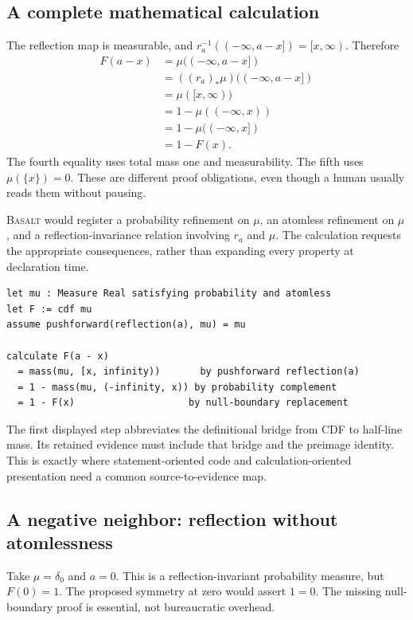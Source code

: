 \documentclass[11pt,a4paper]{article}
\newcommand{\Basalt}{\textsc{Basalt}}
\theoremstyle{plain}
\theoremstyle{definition}
\theoremstyle{remark}
\begin{document}
\subsection{A complete mathematical calculation}
The reflection map is measurable, and
$r_a^{-1}(({-}\infty,a-x])=[x,\infty)$. Therefore
\begin{align*}
 F(a-x)
 &=\mu(({-}\infty,a-x])\\
 &=((r_a)_*\mu)(({-}\infty,a-x])\\
 &=\mu([x,\infty))\\
 &=1-\mu(({-}\infty,x))\\
 &=1-\mu(({-}\infty,x])\\
 &=1-F(x).
\end{align*}
The fourth equality uses total mass one and measurability. The fifth uses
$\mu(\{x\})=0$. These are different proof obligations, even though a human
usually reads them without pausing.

\Basalt{} would register a probability refinement on $\mu$, an atomless
refinement on $\mu$, and a reflection-invariance relation involving $r_a$
and $\mu$. The calculation requests the appropriate consequences, rather
than expanding every property at declaration time.

\par\noindent\begin{minipage}{\linewidth}
\begin{lstlisting}
let mu : Measure Real satisfying probability and atomless
let F := cdf mu
assume pushforward(reflection(a), mu) = mu

calculate F(a - x)
  = mass(mu, [x, infinity))       by pushforward reflection(a)
  = 1 - mass(mu, (-infinity, x)) by probability complement
  = 1 - F(x)                    by null-boundary replacement
\end{lstlisting}
\end{minipage}\par

The first displayed step abbreviates the definitional bridge from CDF to
half-line mass. Its retained evidence must include that bridge and the preimage
identity. This is exactly where statement-oriented code and calculation-oriented
presentation need a common source-to-evidence map.

\subsection{A negative neighbor: reflection without atomlessness}
Take $\mu=\delta_0$ and $a=0$. This is a reflection-invariant probability
measure, but $F(0)=1$. The proposed symmetry at zero would assert $1=0$.
The missing null-boundary proof is essential, not bureaucratic overhead.
\end{document}
